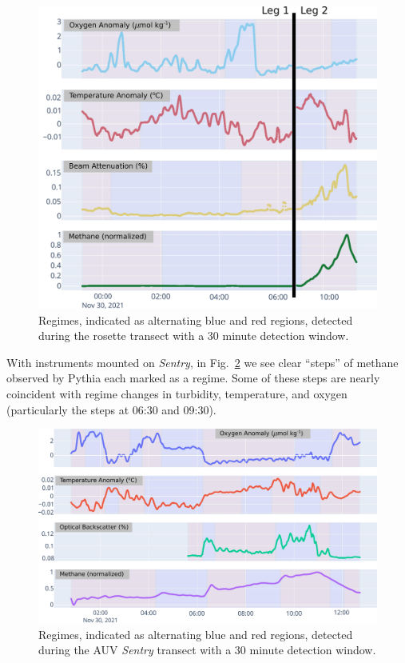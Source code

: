 \begin{figure}[h!]
    \centering
    \includegraphics[width=1\columnwidth]{figures/chap3_rosette_regimes.jpg}
    \caption{Regimes, indicated as alternating blue and red regions, detected during the rosette transect with a 30 minute detection window.}
    \label{fig:rosette_regimes}
\end{figure}


With instruments mounted on \emph{Sentry}, in Fig.~\ref{fig:sentry_regimes} we see clear ``steps'' of methane observed by Pythia each marked as a regime. Some of these steps are nearly coincident with regime changes in turbidity, temperature, and oxygen (particularly the steps at 06:30 and 09:30).  

\begin{figure}[h!]
    \centering
    \includegraphics[width=1\columnwidth]{figures/chap3_sentry_regimes.jpg}
    \caption{Regimes, indicated as alternating blue and red regions, detected during the AUV \emph{Sentry} transect with a 30 minute detection window.}
    \label{fig:sentry_regimes}
\end{figure}

